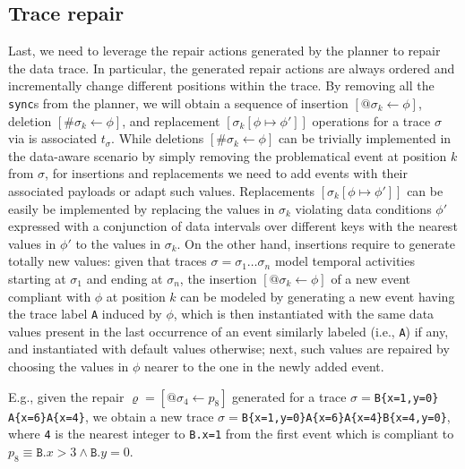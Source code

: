 \subsection{Trace repair}\label{ssec:trerepair}
Last, we need to leverage the repair actions generated by the planner to repair the data trace. In particular, the generated repair actions are always ordered and incrementally change different positions within the trace. By removing all the \texttt{sync}s from the planner, we will obtain a sequence of insertion $[@\sigma_k\leftarrow \phi]$, deletion $[\#\sigma_k\leftarrow \phi]$, and replacement $[\sigma_k[\phi\mapsto \phi']]$ operations for a trace $\sigma$ via is associated $t_\sigma$. While deletions $[\#\sigma_k\leftarrow \phi]$ can be trivially implemented in the data-aware scenario by simply removing the problematical event at position $k$ from $\sigma$, for insertions and replacements we need to add events with their associated payloads or adapt such values. Replacements $[\sigma_k[\phi\mapsto \phi']]$ can be easily be implemented by replacing the values in $\sigma_k$ violating data conditions $\phi'$ expressed with a conjunction of data intervals over different keys with the nearest values in $\phi'$ to the values in $\sigma_k$. On the other hand, insertions require to generate totally new values: given that traces $\sigma=\sigma_1\dots \sigma_n$ model temporal activities starting at $\sigma_1$ and ending at $\sigma_n$,  the insertion $[@\sigma_k\leftarrow \phi]$ of a new event compliant with $\phi$ at position $k$ can be modeled by generating a new event having the trace label \texttt{A} induced by $\phi$, which is then instantiated with the same data values present in the last occurrence of an event similarly labeled (i.e., \texttt{A}) if any, and instantiated with default values otherwise; next, such values are repaired by choosing the values in $\phi$ nearer to the one in the newly added event.

E.g., given the repair $\varrho=[@\sigma_4\leftarrow p_8]$ generated for a trace $\sigma=$\texttt{B\{x=1,y=0\}\\A\{x=6\}A\{x=4\}}, we obtain a new trace $\sigma=$\texttt{B\{x=1,y=0\}$  $A\{x=6\}A\{x=4\}B\{x=4,y=0\}}, where \texttt{4} is the nearest integer to \texttt{B.x=1} from the first event which is compliant to $p_8\equiv\texttt{B}.x>3\wedge \texttt{B}.y=0$. 